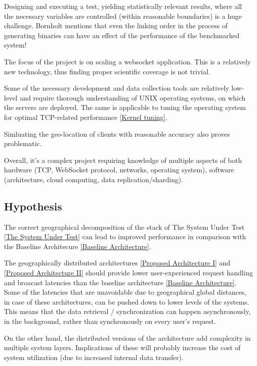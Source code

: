 \documentclass{uvamscse}
\begin{document}
Designing and executing a test, yielding statistically relevant results, where all the necessary variables are controlled (within reasonable boundaries) is a huge challenge. Bornholt \cite{BornBen} mentions that even the linking order in the process of generating binaries can have an effect of the performance of the benchmarked system!

The focus of the project is on scaling a websocket application. This is a relatively new technology, thus finding proper scientific coverage is not trivial.

Some of the necessary development and data collection tools are relatively low-level and require thorough understanding of UNIX operating systems, on which the servers are deployed. The same is applicable to tuning the operating system for optimal TCP-related performance \ref{Kernel tuning}.

Simluating the geo-location of clients with reasonable accuracy also proves problematic.

Overall, it’s a complex project requiring knowledge of multiple aspects of both hardware (TCP, WebSocket protocol, networks, operating system), software (architecture, cloud computing, data replication/sharding).

\subsection{Hypothesis}
The correct geographical decomposition of the stack of The System Under Test \ref{The System Under Test} can lead to improved performance in comparison with the Baseline Architecure \ref{Baseline Architecture}.

The geographically distributed architectures \ref{Proposed Architecture I} and \ref{Proposed Architecture II} should provide lower user-experienced request handling and broacast latencies than the baseline architecture \ref{Baseline Architecture}. Some of the latencies that are unavoidable due to geographical global distances, in case of these architectures, can be pushed down to lower levels of the systems. This means that the data retrieval / synchronization can happen asynchronously, in the background, rather than synchronously on every user's request.


On the other hand, the distributed versions of the architecture add complexity in multiple system layers. Implications of these will probably increase the cost of system utilization (due to increased internal data transfer).
\end{document}
